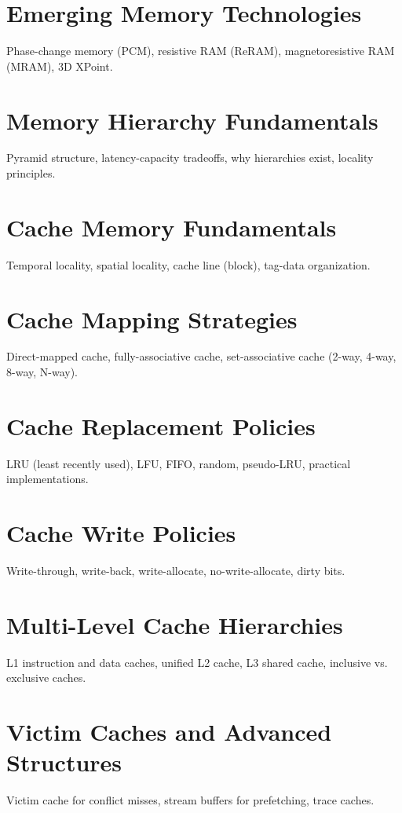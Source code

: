 \chapter{Emerging Memory Technologies}
Phase-change memory (PCM), resistive RAM (ReRAM), magnetoresistive RAM (MRAM), 3D XPoint.


\chapter{Memory Hierarchy Fundamentals}
Pyramid structure, latency-capacity tradeoffs, why hierarchies exist, locality principles.

\chapter{Cache Memory Fundamentals}
Temporal locality, spatial locality, cache line (block), tag-data organization.

\chapter{Cache Mapping Strategies}
Direct-mapped cache, fully-associative cache, set-associative cache (2-way, 4-way, 8-way, N-way).

\chapter{Cache Replacement Policies}
LRU (least recently used), LFU, FIFO, random, pseudo-LRU, practical implementations.

\chapter{Cache Write Policies}
Write-through, write-back, write-allocate, no-write-allocate, dirty bits.

\chapter{Multi-Level Cache Hierarchies}
L1 instruction and data caches, unified L2 cache, L3 shared cache, inclusive vs. exclusive caches.

\chapter{Victim Caches and Advanced Structures}
Victim cache for conflict misses, stream buffers for prefetching, trace caches.

